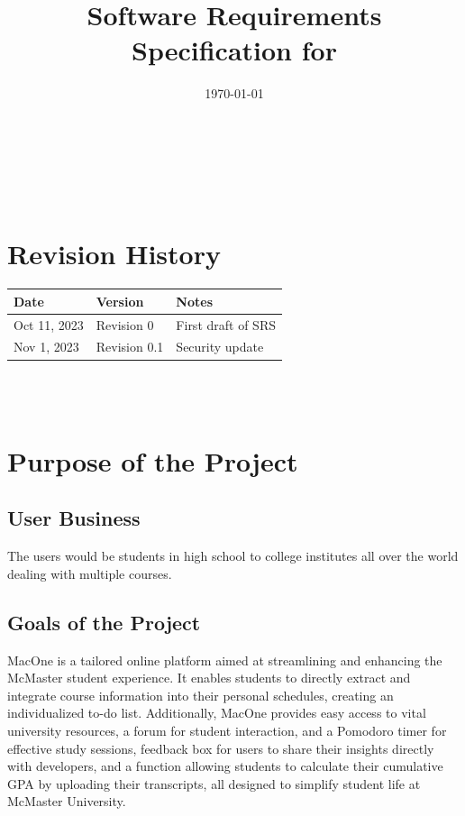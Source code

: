 \documentclass[12pt]{article}
\begin{document}
\title{Software Requirements Specification for \progname} 
\author{\authname}
\date{\today}
	
\maketitle
~\newpage


\tableofcontents

~\newpage

\section*{Revision History}

\begin{tabularx}{\textwidth}{p{3cm}p{2cm}X}
\toprule {\textbf{Date}} & {\textbf{Version}} & {\textbf{Notes}}\\
\midrule
Oct 11, 2023 & Revision 0 & First draft of SRS \\
Nov 1, 2023 & Revision 0.1 & Security update \\
\bottomrule
\end{tabularx}

~\\

~\newpage
\section{Purpose of the Project}
\subsection{User Business}
The users would be students in high school to college institutes all over the world dealing with multiple courses.
\subsection{Goals of the Project}
MacOne is a tailored online platform aimed at streamlining and enhancing the McMaster student experience. It enables students to directly extract and integrate course information into their personal schedules, creating an individualized to-do list. Additionally, MacOne provides easy access to vital university resources, a forum for student interaction, and a Pomodoro timer for effective study sessions, feedback box for users to share their insights directly with developers, and a function allowing students to calculate their cumulative GPA by uploading their transcripts, all designed to simplify student life at McMaster University.
\end{document}
